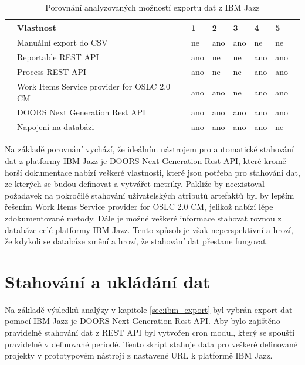 \documentclass[czech,master]{diploma}
\begin{document}
\begin{table}[htp]
\centering
\begin{tabular}{@{}llllllll@{}}
\toprule
 & \textbf{Vlastnost}                          & \textbf{1} & \textbf{2} & \textbf{3} & \textbf{4} & \textbf{5} &  \\ \midrule
 & Manuální export do CSV                      & ne         & ano        & ano        & ne         & ne         &  \\
 & Reportable REST API                         & ano        & ne         & ne         & ano        & ano        &  \\
 & Process REST API                            & ano        & ne         & ne         & ano        & ano        &  \\
 & Work Items Service provider for OSLC 2.0 CM & ano        & ano        & ne         & ano        & ano        &  \\
 & DOORS Next Generation Rest API              & ano        & ano        & ano        & ano        & ano        &  \\
 & Napojení na databázi                        & ano        & ano        & ano        & ano        & ne         &  \\ \bottomrule
\end{tabular}
\caption{Porovnání analyzovaných možností exportu dat z IBM Jazz}
\label{tab:ibm_jazz_export}
\end{table}

Na základě porovnání vychází, že ideálním nástrojem pro automatické stahování dat z platformy IBM Jazz je  DOORS Next Generation Rest API, které kromě horší dokumentace nabízí veškeré vlastnosti, které jsou potřeba pro stahování dat, ze kterých se budou definovat a vytvářet metriky. Pakliže by neexistoval požadavek na pokročilé stahování uživatelských atributů artefaktů byl by lepším řešením Work Items Service provider for OSLC 2.0 CM, jelikož nabízí lépe zdokumentované metody. Dále je možné veškeré informace stahovat rovnou z databáze celé platformy IBM Jazz. Tento způsob je však neperspektivní a hrozí, že kdykoli se databáze změní a hrozí, že stahování dat přestane fungovat.

\section{Stahování a ukládání dat}
Na základě výsledků analýzy v kapitole \ref{sec:ibm_export} byl vybrán export dat pomocí IBM Jazz je  DOORS Next Generation Rest API. Aby bylo zajištěno pravidelné stahování dat z REST API byl vytvořen cron modul, který se spouští pravidelně v definované periodě. Tento skript stahuje data pro veškeré definované projekty v prototypovém nástroji z nastavené URL k platformě IBM Jazz.
\end{document}
